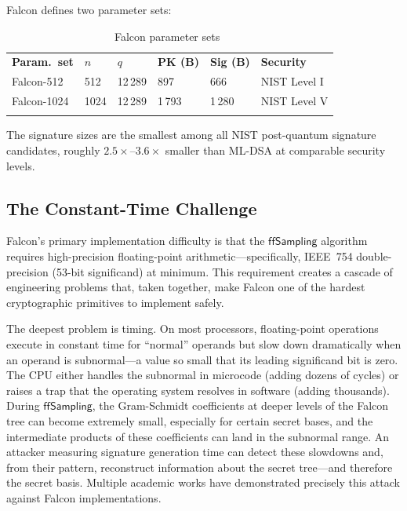 Falcon defines two parameter sets:

\begin{table}[t]
\caption{Falcon parameter sets~\cite{Falcon2020}}
\label{tab:falcon-params}
\begin{tabular}{p{2.5cm}p{1.5cm}p{1.5cm}p{1.5cm}p{1.5cm}p{2cm}}
\hline\noalign{\smallskip}
\textbf{Param.\ set} & $n$ & $q$ & \textbf{PK (B)} & \textbf{Sig (B)} & \textbf{Security} \\
\noalign{\smallskip}\svhline\noalign{\smallskip}
Falcon-512  & 512  & 12\,289 & 897   & 666   & NIST Level I \\
Falcon-1024 & 1024 & 12\,289 & 1\,793 & 1\,280 & NIST Level V \\
\noalign{\smallskip}\hline
\end{tabular}
\end{table}

The signature sizes are the smallest among all NIST post-quantum signature candidates, roughly $2.5\times$--$3.6\times$ smaller than ML-DSA at comparable security levels.

\subsection{The Constant-Time Challenge}
\label{subsec:falcon-constant-time}

Falcon's primary implementation difficulty is that the $\mathsf{ffSampling}$ algorithm requires high-precision floating-point arithmetic---specifically, IEEE~754 double-precision (53-bit significand) at minimum.  This requirement creates a cascade of engineering problems that, taken together, make Falcon one of the hardest cryptographic primitives to implement safely.

The deepest problem is timing.  On most processors, floating-point operations execute in constant time for ``normal'' operands but slow down dramatically when an operand is subnormal---a value so small that its leading significand bit is zero.  The CPU either handles the subnormal in microcode (adding dozens of cycles) or raises a trap that the operating system resolves in software (adding thousands).  During $\mathsf{ffSampling}$, the Gram-Schmidt coefficients at deeper levels of the Falcon tree can become extremely small, especially for certain secret bases, and the intermediate products of these coefficients can land in the subnormal range.  An attacker measuring signature generation time can detect these slowdowns and, from their pattern, reconstruct information about the secret tree---and therefore the secret basis.  Multiple academic works have demonstrated precisely this attack against Falcon implementations.

